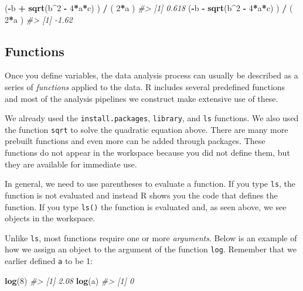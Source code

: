\documentclass[
]{krantz}
\newenvironment{Shaded}{\begin{snugshade}}{\end{snugshade}}
\newcommand{\CommentTok}[1]{\textcolor[rgb]{0.37,0.37,0.37}{\textit{#1}}}
\newcommand{\DecValTok}[1]{\textcolor[rgb]{0.06,0.06,0.06}{#1}}
\newcommand{\KeywordTok}[1]{\textcolor[rgb]{0.27,0.27,0.27}{\textbf{#1}}}
\newcommand{\NormalTok}[1]{#1}
\newcommand{\OperatorTok}[1]{\textcolor[rgb]{0.43,0.43,0.43}{\textbf{#1}}}
\newcommand{\StringTok}[1]{\textcolor[rgb]{0.5,0.5,0.5}{#1}}
\begin{document}
\begin{Shaded}
\begin{Highlighting}[]
\NormalTok{(}\OperatorTok{-}\NormalTok{b }\OperatorTok{+}\StringTok{ }\KeywordTok{sqrt}\NormalTok{(b}\OperatorTok{^}\DecValTok{2} \OperatorTok{-}\StringTok{ }\DecValTok{4}\OperatorTok{*}\NormalTok{a}\OperatorTok{*}\NormalTok{c) ) }\OperatorTok{/}\StringTok{ }\NormalTok{( }\DecValTok{2}\OperatorTok{*}\NormalTok{a )}
\CommentTok{#> [1] 0.618}
\NormalTok{(}\OperatorTok{-}\NormalTok{b }\OperatorTok{-}\StringTok{ }\KeywordTok{sqrt}\NormalTok{(b}\OperatorTok{^}\DecValTok{2} \OperatorTok{-}\StringTok{ }\DecValTok{4}\OperatorTok{*}\NormalTok{a}\OperatorTok{*}\NormalTok{c) ) }\OperatorTok{/}\StringTok{ }\NormalTok{( }\DecValTok{2}\OperatorTok{*}\NormalTok{a )}
\CommentTok{#> [1] -1.62}
\end{Highlighting}
\end{Shaded}

\hypertarget{functions}{%
\subsection{Functions}\label{functions}}

Once you define variables, the data analysis process can usually be described as a series of \emph{functions} applied to the data. R includes several predefined functions and most of the analysis pipelines we construct make extensive use of these.

We already used the \texttt{install.packages}, \texttt{library}, and \texttt{ls} functions. We also used the function \texttt{sqrt} to solve the quadratic equation above. There are many more prebuilt functions and even more can be added through packages. These functions do not appear in the workspace because you did not define them, but they are available for immediate use.

In general, we need to use parentheses to evaluate a function. If you type \texttt{ls}, the function is not evaluated and instead R shows you the code that defines the function. If you type \texttt{ls()} the function is evaluated and, as seen above, we see objects in the workspace.

Unlike \texttt{ls}, most functions require one or more \emph{arguments}. Below is an example of how we assign an object to the argument of the function \texttt{log}. Remember that we earlier defined \texttt{a} to be 1:

\begin{Shaded}
\begin{Highlighting}[]
\KeywordTok{log}\NormalTok{(}\DecValTok{8}\NormalTok{)}
\CommentTok{#> [1] 2.08}
\KeywordTok{log}\NormalTok{(a) }
\CommentTok{#> [1] 0}
\end{Highlighting}
\end{Shaded}
\end{document}
